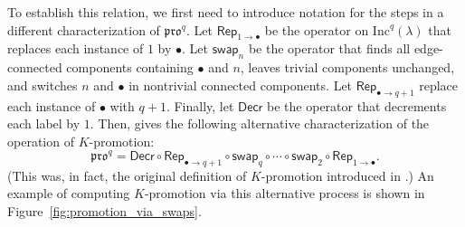 \documentclass[12pt]{amsart}
\theoremstyle{definition}
\theoremstyle{remark}
\numberwithin{equation}{section}
\newcommand{\inc}{\ensuremath{\mathrm{Inc}}}
\newcommand{\pro}{\mathfrak{pro}}
\newcommand{\swap}{\ensuremath{\mathsf{swap}}}
\newcommand{\decr}{\ensuremath{\mathsf{Decr}}}
\newcommand{\rep}{\ensuremath{\mathsf{Rep}}}
\begin{document}
To establish this relation, we first need to introduce notation for the steps in a different characterization of $\pro^q$. Let $\rep_{1 \rightarrow \bullet}$ be the operator on $\inc^q(\lambda)$ that replaces each instance of $1$ by $\bullet$. Let $\swap_n$ be the operator that finds all edge-connected components containing $\bullet$ and $n$, leaves trivial components unchanged, and switches $n$ and $\bullet$ in nontrivial connected components. Let $\rep_{\bullet \rightarrow q+1}$ replace each instance of $\bullet$ with $q+1$. Finally, let $\decr$ be the operator that decrements each label by $1$. Then, \cite[Proposition~2.4]{DPS} gives the following alternative characterization of the operation of $K$-promotion: 
\[
\pro^q = \decr \circ \rep_{\bullet \rightarrow q+1} \circ \swap_q \circ \cdots \circ \swap_2 \circ \rep_{1 \rightarrow \bullet}.
\]
 (This was, in fact, the original definition of $K$-promotion introduced in \cite{Pechenik}.) An example of computing $K$-promotion via this alternative process is shown in Figure~\ref{fig:promotion_via_swaps}.
 
\end{document}
